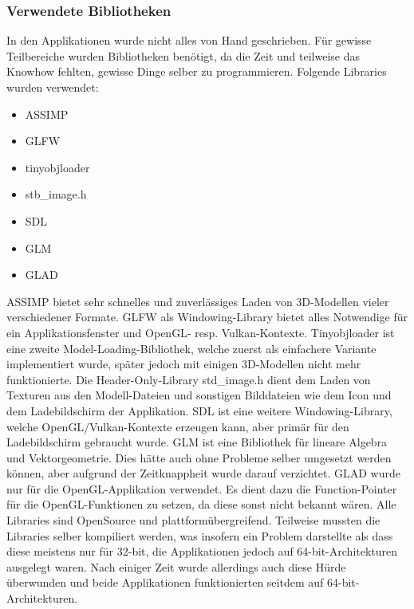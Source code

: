 \documentclass[titlepage, 11pt, a4paper, ngerman]{article}
\begin{document}
\subsubsection{Verwendete Bibliotheken}
In den Applikationen wurde nicht alles von Hand geschrieben. Für gewisse Teilbereiche wurden Bibliotheken benötigt, da die Zeit und teilweise das Knowhow fehlten, gewisse Dinge selber zu programmieren. Folgende Libraries wurden verwendet:
\begin{itemize}
    \item \acrfull{ASSIMP}
    \item \acrfull{GLFW}
    \item tinyobjloader
    \item stb\_image.h
    \item \acrfull{SDL}
    \item \acrfull{GLM}
    \item GLAD
\end{itemize}
\acrshort{ASSIMP} bietet sehr schnelles und zuverlässiges Laden von 3D-Modellen vieler verschiedener Formate. \acrshort{GLFW} als Windowing-Library bietet alles Notwendige für ein Applikationsfenster und \acrshort{OpenGL}- resp. Vulkan-Kontexte. Tinyobjloader ist eine zweite Model-Loading-Bibliothek, welche zuerst als einfachere Variante implementiert wurde, später jedoch mit einigen 3D-Modellen nicht mehr funktionierte. Die Header-Only-Library std\_image.h dient dem Laden von Texturen aus den Modell-Dateien und sonstigen Bilddateien wie dem Icon und dem Ladebildschirm der Applikation. \acrshort{SDL} ist eine weitere Windowing-Library, welche \acrshort{OpenGL}/Vulkan-Kontexte erzeugen kann, aber primär für den Ladebildschirm gebraucht wurde. \acrshort{GLM} ist eine Bibliothek für lineare Algebra und Vektorgeometrie. Dies hätte auch ohne Probleme selber umgesetzt werden können, aber aufgrund der Zeitknappheit wurde darauf verzichtet. GLAD wurde nur für die \acrshort{OpenGL}-Applikation verwendet. Es dient dazu die Function-Pointer für die \acrshort{OpenGL}-Funktionen zu setzen, da diese sonst nicht bekannt wären. Alle Libraries sind OpenSource und plattformübergreifend. Teilweise mussten die Libraries selber kompiliert werden, was insofern ein Problem darstellte als dass diese meistens nur für 32-bit, die Applikationen jedoch auf 64-bit-Architekturen ausgelegt waren. Nach einiger Zeit wurde allerdings auch diese Hürde überwunden und beide Applikationen funktionierten seitdem auf 64-bit-Architekturen.
\end{document}
